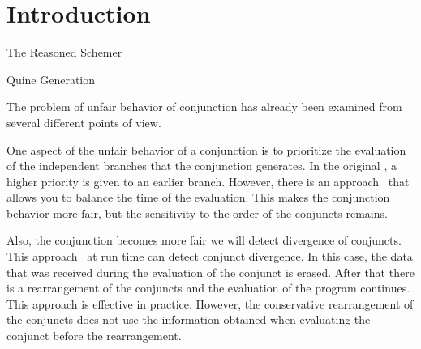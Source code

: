 \section{Introduction}

The Reasoned Schemer~\cite{fair:TheReasonedSchemer}

Quine Generation~\cite{fair:quines}

The problem of unfair behavior of conjunction has already been examined from several different points of view.

One aspect of the unfair behavior of a conjunction is to prioritize the evaluation of the independent branches that the conjunction generates. In the original \mk, a higher priority is given to an earlier branch. However, there is an approach~\cite{fair:towardsAM} that allows you to balance the time of the evaluation. This makes the conjunction behavior more fair, but the sensitivity to the order of the conjuncts remains.

Also, the conjunction becomes more fair we will detect divergence of conjuncts. This approach~\cite{fair:DivTest} at run time can detect conjunct divergence. In this case, the data that was received during the evaluation of the conjunct is erased. After that there is a rearrangement of the conjuncts and the evaluation of the program continues. This approach is effective in practice. However, the conservative rearrangement of the conjuncts does not use the information obtained when evaluating the conjunct before the rearrangement.
